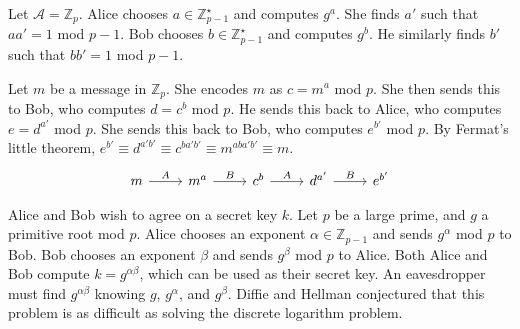 \begin{example}
    Let \( \mathcal A = \mathbb Z_p \).
    Alice chooses \( a \in \mathbb Z_{p-1}^\star \) and computes \( g^a \).
    She finds \( a' \) such that \( aa' = 1 \) mod \( p-1 \).
    Bob chooses \( b \in \mathbb Z_{p-1}^\star \) and computes \( g^b \).
    He similarly finds \( b' \) such that \( bb' = 1 \) mod \( p-1 \).

    Let \( m \) be a message in \( \mathbb Z_p \).
    She encodes \( m \) as \( c = m^a \) mod \( p \).
    She then sends this to Bob, who computes \( d = c^b \) mod \( p \).
    He sends this back to Alice, who computes \( e = d^{a'} \) mod \( p \).
    She sends this back to Bob, who computes \( e^{b'} \) mod \( p \).
    By Fermat's little theorem, \( e^{b'} \equiv d^{a'b'} \equiv c^{ba'b'} \equiv m^{aba'b'} \equiv m \).
    \[\begin{tikzcd}
        m & {m^a} & {c^b} & {d^{a'}} & {e^{b'}}
        \arrow["A", from=1-1, to=1-2]
        \arrow["B", from=1-2, to=1-3]
        \arrow["A", from=1-3, to=1-4]
        \arrow["B", from=1-4, to=1-5]
    \end{tikzcd}\]
\end{example}
\begin{example}
    Alice and Bob wish to agree on a secret key \( k \).
    Let \( p \) be a large prime, and \( g \) a primitive root mod \( p \).
    Alice chooses an exponent \( \alpha \in \mathbb Z_{p-1} \) and sends \( g^\alpha \) mod \( p \) to Bob.
    Bob chooses an exponent \( \beta \) and sends \( g^\beta \) mod \( p \) to Alice.
    Both Alice and Bob compute \( k = g^{\alpha\beta} \), which can be used as their secret key.
    An eavesdropper must find \( g^{\alpha\beta} \) knowing \( g \), \( g^{\alpha} \), and \( g^{\beta} \).
    Diffie and Hellman conjectured that this problem is as difficult as solving the discrete logarithm problem.
\end{example}


